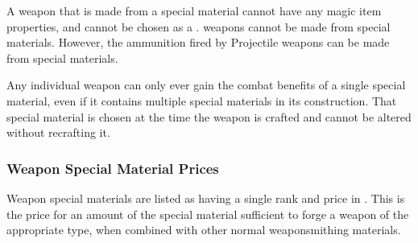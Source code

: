         A weapon that is made from a special material cannot have any magic item properties, and cannot be chosen as a .
         weapons cannot be made from special materials.
        However, the ammunition fired by Projectile weapons can be made from special materials.

        Any individual weapon can only ever gain the combat benefits of a single special material, even if it contains multiple special materials in its construction.
        That special material is chosen at the time the weapon is crafted and cannot be altered without recrafting it.

        \subsubsection{Weapon Special Material Prices}
            Weapon special materials are listed as having a single rank and price in .
            This is the price for an amount of the special material sufficient to forge a weapon of the appropriate type, when combined with other normal weaponsmithing materials.

